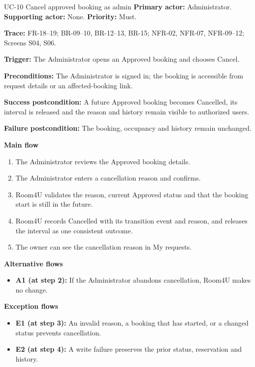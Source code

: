 \begin{usecasebox}{UC-10 Cancel approved booking as admin}
\noindent\textbf{Primary actor:} Administrator.\quad
\textbf{Supporting actor:} None.\quad
\textbf{Priority:} Must.\par
\textbf{Trace:} FR-18--19; BR-09--10, BR-12--13, BR-15; NFR-02, NFR-07, NFR-09--12; Screens S04, S06.\par
\textbf{Trigger:} The Administrator opens an Approved booking and chooses Cancel.\par
\textbf{Preconditions:} The Administrator is signed in; the booking is accessible from request details or an affected-booking link.\par
\textbf{Success postcondition:} A future Approved booking becomes Cancelled, its interval is released and the reason and history remain visible to authorized users.\par
\textbf{Failure postcondition:} The booking, occupancy and history remain unchanged.\par
\textbf{Main flow}
\begin{enumerate}[label=\arabic*.,leftmargin=2em,itemsep=1pt,topsep=2pt]
  \item The Administrator reviews the Approved booking details.
  \item The Administrator enters a cancellation reason and confirms.
  \item Room4U validates the reason, current Approved status and that the booking start is still in the future.
  \item Room4U records Cancelled with its transition event and reason, and releases the interval as one consistent outcome.
  \item The owner can see the cancellation reason in My requests.
\end{enumerate}
\textbf{Alternative flows}
\begin{itemize}[label={},leftmargin=0pt,itemsep=1pt,topsep=1pt]
  \item \textbf{A1 (at step 2):} If the Administrator abandons cancellation, Room4U makes no change.
\end{itemize}
\textbf{Exception flows}
\begin{itemize}[label={},leftmargin=0pt,itemsep=1pt,topsep=1pt]
  \item \textbf{E1 (at step 3):} An invalid reason, a booking that has started, or a changed status prevents cancellation.
  \item \textbf{E2 (at step 4):} A write failure preserves the prior status, reservation and history.
\end{itemize}
\end{usecasebox}

